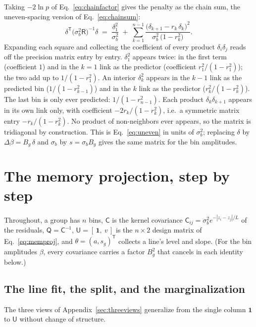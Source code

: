 \documentclass[11pt]{article}
\newcommand{\ones}{\mathbf{1}} %
\newcommand{\Cov}{\mathsf{C}}
\newcommand{\T}{^{\mathsf{T}}}
\begin{document}
Taking $-2 \ln p$ of Eq.~\eqref{eq:chainfactor} gives the penalty as
the chain sum, the uneven-spacing version of
Eq.~\eqref{eq:chainsum}:
\begin{equation}
  \delta\T \bigl(\sigma_b^2 \mathsf{R}\bigr)^{-1} \delta
  \;=\;
  \frac{\delta_1^2}{\sigma_b^2}
  \;+\;
  \sum_{k=1}^{n-1}
  \frac{\bigl(\delta_{k+1} - r_k\,\delta_k\bigr)^2}
       {\sigma_b^2\,\bigl(1 - r_k^2\bigr)} .
  \label{eq:chainsumuneven}
\end{equation}
Expanding each square and collecting the coefficient of every product
$\delta_i \delta_j$ reads off the precision matrix entry by entry.
$\delta_1^2$ appears twice: in the first term (coefficient $1$) and in
the $k = 1$ link as the predictor (coefficient $r_1^2/(1 - r_1^2)$);
the two add up to $1/(1 - r_1^2)$.  An interior $\delta_k^2$ appears in
the $k-1$ link as the predicted bin ($1/(1 - r_{k-1}^2)$) and in the
$k$ link as the predictor ($r_k^2/(1 - r_k^2)$).  The last bin is only
ever predicted: $1/(1 - r_{n-1}^2)$.  Each product
$\delta_k \delta_{k+1}$ appears in its own link only, with coefficient
$-2 r_k/(1 - r_k^2)$, i.e.\ a symmetric matrix entry
$-r_k/(1 - r_k^2)$.  No product of non-neighbors ever appears, so the
matrix is tridiagonal by construction.  This is Eq.~\eqref{eq:uneven}
in units of $\sigma_b^2$; replacing $\delta$ by
$\Delta\beta = B_g\,\delta$ and $\sigma_b$ by $s = \sigma_b B_g$ gives
the same matrix for the bin amplitudes.

\section{The memory projection, step by step}
\label{app:memory}

Throughout, a group has $n$ bins, $\Cov$ is the kernel covariance
$\Cov_{ij} = \sigma_b^2 e^{-|z_i - z_j|/L}$ of the residuals,
$\mathsf{Q} = \Cov^{-1}$, $\mathsf{U} = [\,\ones,\ v\,]$ is the
$n \times 2$ design matrix of Eq.~\eqref{eq:memproj}, and
$\theta = (a, s_g)\T$ collects a line's level and slope.  (For the bin
amplitudes $\beta$, every covariance carries a factor $B_g^2$ that
cancels in each identity below.)

\subsection{The line fit, the split, and the marginalization}

The three views of Appendix~\ref{sec:threeviews} generalize from the
single column $\ones$ to $\mathsf{U}$ without change of structure.
\end{document}
